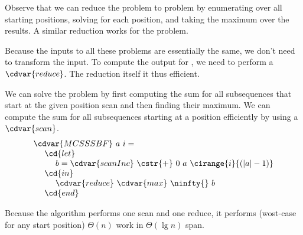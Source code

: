 \begin{gram}
Observe that we can reduce the \MCSS{} problem to \MCSSS{} problem by
enumerating over all starting positions, solving \MCSSS{} for each
position, and taking the maximum over the results.
%
A similar reduction works for the \MCSSE{} problem.

Because the inputs to all these problems are essentially the same, we
don't need to transform the input.  To compute the output for \MCSS{},
we need to perform a $\cdvar{reduce}$.
%
The reduction itself it thus efficient.
\end{gram}



\begin{algorithm}[\MCSSS{}]
\label{alg:mcss::reduction::mcsss}
We can solve the \MCSSS{} problem by first computing the sum for all
subsequences that start at the given position scan and then finding
their maximum.
%
We can compute the sum for all subsequences starting at a position
efficiently by using a $\cdvar{scan}$.
%
\[
\begin{array}{l}
\cdvar{MCSSSBF}~a~i =
\\ 
~~~~\cd{let} 
\\ 
~~~~~~~~b = \cdvar{scanInc}~\cstr{+}~0~a~\cirange{i}{(|a|-1)}
\\ 
~~~~\cd{in}
\\ 
~~~~~~~~\cdvar{reduce}~\cdvar{max}~\ninfty{}~b
\\ 
~~~~\cd{end}
\end{array}
\]

Because the algorithm performs one scan and one reduce, it performs
(wost-case for any start position) $\Theta(n)$ work in
$\Theta(\lg{n})$ span.

\end{algorithm}
%

